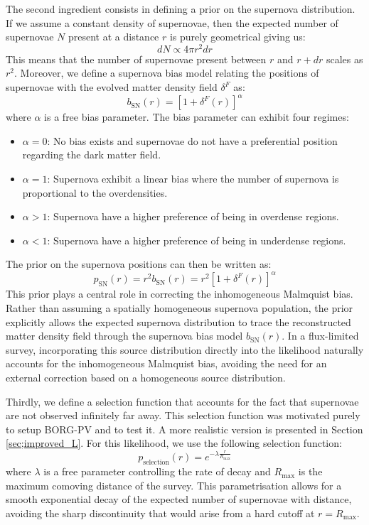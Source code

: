 The second ingredient consists in defining a prior on the supernova distribution. If we assume a constant density of 
supernovae, then the expected number of supernovae $N$ present at a distance $r$ is purely geometrical giving us:
\begin{equation}
    dN \propto 4\pi r^2 dr
\end{equation}
This means that the number of supernovae present between $r$ and $r+dr$ scales as $r^2$. Moreover, we define a supernova bias model relating the positions of supernovae with 
the evolved matter density field $\delta^F$ as:
\begin{equation}
    b_{\text{SN}}(r) = [1 + \delta^F(r)]^{\alpha}
\end{equation}
where $\alpha$ is a free bias parameter. The bias parameter can exhibit four regimes:
\begin{itemize}
    \item $\alpha=0$: No bias exists and supernovae do not have a preferential position regarding the dark matter field.
    \item $\alpha=1$: Supernova exhibit a linear bias where the number of supernova is proportional to the overdensities.
    \item $\alpha>1$: Supernova have a higher preference of being in overdense regions.
    \item $\alpha<1$: Supernova have a higher preference of being in underdense regions.
\end{itemize}
The prior on the supernova positions can then be written as:
\begin{equation}
    p_{\text{SN}}(r) = r^2 b_{\text{SN}}(r) = r^2 [1 + \delta^F(r)]^{\alpha}
\end{equation}
This prior plays a central role in correcting the inhomogeneous Malmquist bias. Rather than assuming a spatially homogeneous supernova population, 
the prior explicitly allows the expected supernova distribution to trace the reconstructed matter density field through the supernova bias 
model $ b_{\text{SN}}(r)$. 
In a flux-limited survey, incorporating this source distribution directly into the likelihood naturally accounts for the inhomogeneous Malmquist bias, 
avoiding the need for an external correction based on a homogeneous source distribution.

Thirdly, we define a selection function that accounts for the fact that supernovae are not observed infinitely far away. 
This selection function was motivated purely to setup BORG-PV and to test it. A more realistic version is presented in Section \ref{sec;improved_L}. 
For this likelihood, we use the following selection function:
\begin{equation}
    p_{\text{selection}}(r) = e^{-\lambda \frac{r}{R_{\text{max}}}}
\end{equation}
where $\lambda$ is a free parameter controlling the rate of decay and $R_{\text{max}}$ is the maximum comoving distance of the survey. 
This parametrisation allows for a smooth exponential decay of the expected number of supernovae with distance, avoiding the sharp 
discontinuity that would arise from a hard cutoff at $r = R_{\text{max}}$. \\

